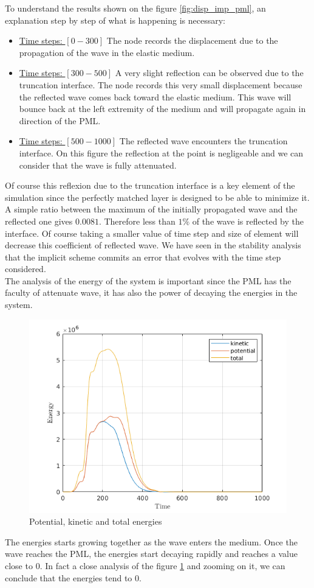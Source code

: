 To understand the results shown on the figure \ref{fig:disp_imp_pml}, an explanation step by step of what is happening is necessary:
\begin{itemize}
\item \underline{Time steps: $[0-300]$} The node records the displacement due to the propagation of the wave in the elastic medium.  
\item \underline{Time steps: $[300-500]$} A very slight reflection can be observed due to the truncation interface. The node records this very small displacement because the reflected wave comes back toward the elastic medium. This wave will bounce back at the left extremity of the medium and will propagate again in direction of the PML.
\item \underline{Time steps: $[500-1000]$} The reflected wave encounters the truncation interface. On this figure the reflection at the point is negligeable and we can consider that the wave is fully attenuated. 
\end{itemize}
Of course this reflexion due to the truncation interface is a key element of the simulation since the perfectly matched layer is designed to be able to minimize it. A simple ratio between the maximum of the initially propagated wave and the reflected one gives $0.0081$. Therefore less than $1\%$ of the wave is reflected by the interface.
Of course taking a smaller value of time step and size of element will decrease this coefficient of reflected wave. We have seen in the stability analysis that the implicit scheme commits an error that evolves with the time step considered.\\
The analysis of the energy of the system is important since the PML has the faculty of attenuate wave, it has also the power of decaying the energies in the system.
\begin{figure}[H]
  \centering
  \includegraphics[scale=0.8]{images/simple_test_energies_imp.png}
  \caption{Potential, kinetic and total energies}
  \label{fig:simple_test_en_imp}
\end{figure}          
The energies starts growing together as the wave enters the medium. Once the wave reaches the PML, the energies start decaying rapidly and reaches a value close to $0$. In fact a close analysis of the figure \ref{fig:simple_test_en_imp} and zooming on it, we can conclude that the energies tend to $0$. 

